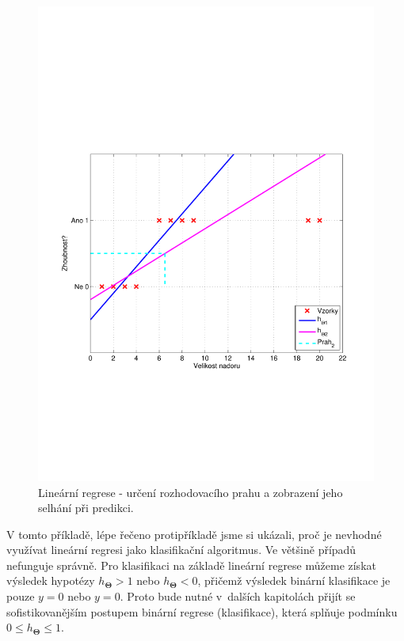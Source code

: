{\begin{figure}[!ht]
\begin{minipage}[b]{0.48\textwidth}
		\label{fig:nadory4}
	\end{minipage}%
	\hfill
	\begin{minipage}[b]{0.48\textwidth}
		\includegraphics[width = \textwidth, trim = 2.5cm 7cm 2cm 9cm]{./Img/BinarniRegrese/prikladNadory/tumor_5st_example.pdf}
		\caption{Lineární regrese - určení rozhodovacího prahu a zobrazení jeho selhání při predikci.}
		\label{fig:nadory5}
	\end{minipage}%
\end{figure}}

\par{V tomto příkladě, lépe řečeno protipříkladě jsme si ukázali, proč je nevhodné využívat lineární regresi jako klasifikační algoritmus. Ve většině případů nefunguje správně. Pro klasifikaci na základě lineární regrese můžeme získat výsledek hypotézy $h_{\bm{\Theta}} > 1$ nebo $h_{\bm{\Theta}} < 0$, přičemž výsledek binární klasifikace je pouze $y = 0$ nebo $y = 0$. Proto bude nutné v~dalších kapitolách přijít se sofistikovanějším postupem binární regrese (klasifikace), která splňuje podmínku $0 \leq h_{\bm{\Theta}} \leq 1$.}




